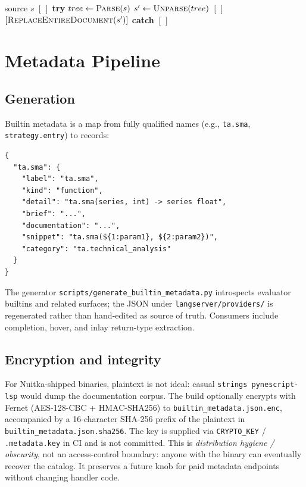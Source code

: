 \documentclass[11pt,a4paper]{article}
\begin{document}
\begin{algorithm}[t]
\caption{FormatDocument}
\label{alg:format}
\begin{algorithmic}[1]
\Require source \(s\)
  \State \Return \([\,]\)
\EndIf
\State \textbf{try} \(tree \gets \textsc{Parse}(s)\)
\State \(s' \gets \textsc{Unparse}(tree)\)
  \State \Return \([\,]\)
\EndIf
\State \Return \([\textsc{ReplaceEntireDocument}(s')]\)
\State \textbf{catch} \Return \([\,]\)
\end{algorithmic}
\end{algorithm}

\section{Metadata Pipeline}
\label{sec:metadata}

\subsection{Generation}
\label{sec:meta-gen}

Builtin metadata is a map from fully qualified names (e.g., \texttt{ta.sma},
\texttt{strategy.entry}) to records:
\begin{lstlisting}[style=python,numbers=none,basicstyle=\ttfamily\scriptsize]
{
  "ta.sma": {
    "label": "ta.sma",
    "kind": "function",
    "detail": "ta.sma(series, int) -> series float",
    "brief": "...",
    "documentation": "...",
    "snippet": "ta.sma(${1:param1}, ${2:param2})",
    "category": "ta.technical_analysis"
  }
}
\end{lstlisting}
The generator \texttt{scripts/generate\_builtin\_metadata.py} introspects evaluator
builtins and related surfaces; the JSON under
\texttt{langserver/providers/} is regenerated rather than hand-edited as source of
truth. Consumers include completion, hover, and inlay return-type extraction.

\subsection{Encryption and integrity}
\label{sec:meta-enc}

For Nuitka-shipped binaries, plaintext is not ideal: casual
\texttt{strings pynescript-lsp} would dump the documentation corpus. The build
optionally encrypts with Fernet (AES-128-CBC + HMAC-SHA256) to
\texttt{builtin\_metadata.json.enc}, accompanied by a 16-character SHA-256 prefix of
the plaintext in \texttt{builtin\_metadata.json.sha256}. The key is supplied via
\texttt{CRYPTO\_KEY} / \texttt{.metadata.key} in CI and is not committed. This is
\emph{distribution hygiene / obscurity}, not an access-control boundary: anyone with
the binary can eventually recover the catalog. It preserves a future knob for paid
metadata endpoints without changing handler code.
\end{document}
